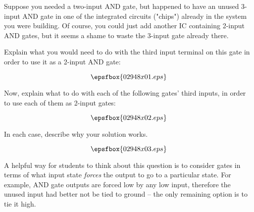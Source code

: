 

Suppose you needed a two-input AND gate, but happened to have an unused 3-input AND gate in one of the integrated circuits ("chips") already in the system you were building.  Of course, you could just add another IC containing 2-input AND gates, but it seems a shame to waste the 3-input gate already there.

Explain what you would need to do with the third input terminal on this gate in order to use it as a 2-input AND gate:

$$\epsfbox{02948x01.eps}$$

Now, explain what to do with each of the following gates' third inputs, in order to use each of them as 2-input gates:

$$\epsfbox{02948x02.eps}$$

In each case, describe why your solution works.







$$\epsfbox{02948x03.eps}$$







A helpful way for students to think about this question is to consider gates in terms of what input state {\it forces} the output to go to a particular state.  For example, AND gate outputs are forced low by any low input, therefore the unused input had better not be tied to ground -- the only remaining option is to tie it high.





